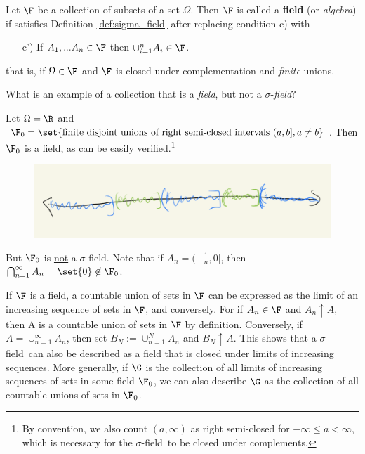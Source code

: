 \documentclass{article} %
\renewcommand{\sf}{$\sigma$-field}
\begin{document}
\begin{definition}
Let $\F$ be a collection of subsets of a set $\Omega$.  Then $\F$ is called a \textbf{field} (or \textit{algebra})  if satisfies Definition \ref{def:sigma_field} after replacing condition c) with

\begin{enumerate}
	\item[c')] If $A_1,...A_n \in \F$ then $\cup_{i=1}^n A_i \in \F$.
\end{enumerate}
that is, if $\Omega \in \F$ and $\F$ is closed under complementation and \textit{finite} unions.
\label{def:field}	
\end{definition}

\begin{example} What is an example of a collection that is a \textit{field}, but not a $\sigma$-\textit{field}?  

Let $\Omega=\R$ and $\F_0 = \set{\text{finite disjoint unions of right semi-closed intervals } (a,b], a \neq b}$.  Then $\F_0$ is a field, as can be easily verified.\footnote{By convention, we also count $(a, \infty)$ as right semi-closed for $-\infty\leq a < \infty$, which is necessary for the \sf\ to be closed under complements.}   

\begin{figure}[h!]
\centering
\includegraphics[width=.6\textwidth]{images/rsc_intervals}	
\end{figure}

But $\F_0$ is \underline{not} a \sf.  Note that if $A_n = (-\frac{1}{n},0]$, then $\bigcap_{n=1}^\infty A_n = \set{0}  \not\in \F_0$.
\label{ex:field_of_finite_disjoint_unions_of_rsc_intervals}
\end{example}

\begin{remark}
 If $\F$ is a field, a countable union of sets in $\F$ can be expressed as the limit of an increasing sequence of sets in $\F$, and conversely. For if $A_n \in \F$ and $A_n \uparrow A$, then A is a countable union of sets in $\F$ by definition.  Conversely, if $A = \cup_{n=1}^\infty A_n$, then set $B_N := \cup_{n=1}^N A_n$ and $B_N \uparrow A$. This shows that a \sf\ can also be described as a field that is closed under limits of increasing sequences.  More generally, if $\G$ is the collection of all limits of increasing sequences of sets in some field $\F_0$, we can also describe $\G$ as the collection of all countable unions of sets in $\F_0$. \label{rk:the_limits_of_increasing_and_decreasing_sequences_of_sets_in_a_field_are_also_the_countable_unions}
\end{remark}
\end{document}
